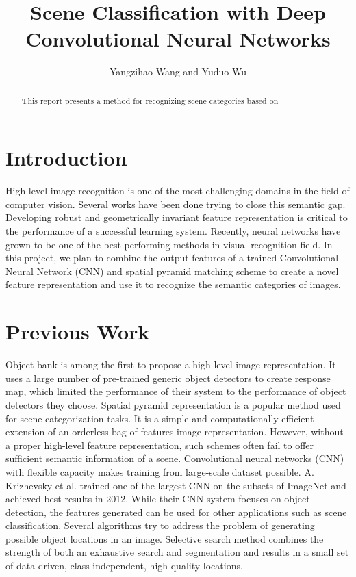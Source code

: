 \documentclass[letterpaper,twocolumn,10pt]{article}
\title{Scene Classification with Deep Convolutional Neural Networks}
\author{Yangzihao Wang and Yuduo Wu}
\begin{document}
\maketitle

\begin{abstract}
This report presents a method for recognizing scene categories based on

\end{abstract}

\section{Introduction}
High-level image recognition is one of the most challenging domains in the
field of computer vision. Several works have been done trying to close this
semantic gap. Developing robust and geometrically invariant feature
representation is critical to the performance of a successful learning system.
Recently, neural networks have grown to be one of the best-performing methods
in visual recognition field. In this project, we plan to combine the output
features of a trained Convolutional Neural Network (CNN) and spatial pyramid
matching scheme to create a novel feature representation and use it to
recognize the semantic categories of images.

\section{Previous Work}
Object
bank\cite{OB} is among the first to propose a high-level image representation.
It uses a large number of pre-trained generic object detectors to create
response map, which limited the performance of their system to the performance
of object detectors they choose. Spatial pyramid representation\cite{SPM} is
a popular method used for scene categorization tasks. It is a simple and
computationally efficient extension of an orderless bag-of-features image
representation. However, without a proper high-level feature representation,
such schemes often fail to offer sufficient semantic information of a scene.
Convolutional neural networks (CNN) with flexible capacity makes training from
large-scale dataset possible. A. Krizhevsky et al.\cite{CNN} trained one of the
largest CNN on the subsets of ImageNet and achieved best results in 2012. While
their CNN system focuses on object detection, the features generated can be
used for other applications such as scene classification. Several algorithms
try to address the problem of generating possible object locations in an image.
Selective search method combines the strength of both an exhaustive search and
segmentation and results in a small set of data-driven, class-independent, high
quality locations.
\end{document}
